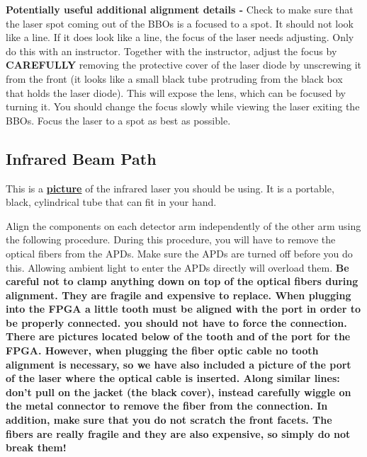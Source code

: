 \documentclass{../lab}
\begin{document}
\textbf{Potentially useful additional alignment details -} Check to make sure that the laser spot coming out of the BBOs is a focused to a spot. It should not look like a line. If it does look like a line, the focus of the laser needs adjusting. Only do this with an instructor. Together with the instructor, adjust the focus by \textbf{CAREFULLY} removing the protective cover of the laser diode by unscrewing it from the front (it looks like a small black tube protruding from the black box that holds the laser diode). This will expose the lens, which can be focused by turning it. You should change the focus slowly while viewing the laser exiting the BBOs. Focus the laser to a spot as best as possible.


\subsection{Infrared Beam Path}

This is a \href{http://experimentationlab.berkeley.edu/sites/default/files/QIE/laser.JPG}{\textbf{picture}} of the infrared laser you should be using. It is a portable, black, cylindrical tube that can fit in your hand.

Align the components on each detector arm independently of the other arm using the following procedure. During this procedure, you will have to remove the optical fibers from the APDs. Make sure the APDs are turned off before you do this. Allowing ambient light to enter the APDs directly will overload them. \textbf{Be careful not to clamp anything down on top of the optical fibers during alignment. They are fragile and expensive to replace. When plugging into the FPGA a little tooth must be aligned with the port in order to be properly connected. you should not have to force the connection. There are pictures located below }\textbf{of the tooth and }\textbf{of the port for the FPGA. However, when plugging the fiber optic cable no tooth alignment is necessary, so we have also included a picture }\textbf{of the port of the laser where the optical cable is inserted. Along similar lines: don't pull on the jacket (the black cover), instead carefully wiggle on the metal connector to remove the fiber from the connection. In addition, make sure that you do not scratch the front facets. The fibers are really fragile and they are also expensive, so simply do not break them!}
\end{document}
